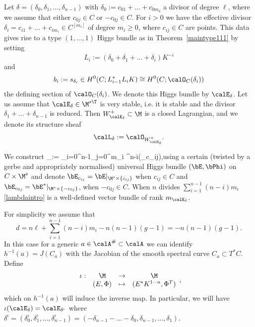 Let $\delta=(\delta_0,\delta_1,\dots,\delta_{n-1})$ with $\delta_0:=c_{01}+\dots+c_{0m_0}$ a divisor of degree $\ell$, where we assume that either $c_{0j}\in C$ or $-c_{0j}\in C$.  For $i>0$ we have the effective divisor $\delta_i={c_{i1}+\dots+c_{im_{i}}}\in C^{[m_i]}$  of degree $m_i\geq 0$, where $c_{ij}\in C$ are points. This data gives rise to a type $(1,\dots,1)$ Higgs bundle  as in Theorem~\ref{maintype111} by setting $$L_i:=(\delta_0+\delta_1+\dots + \delta_{i})K^{-i}$$ and $$b_i:=s_{\delta_i}\in H^0(C;L_{i-1}^*L_{i}K)\cong H^0(C;\calO_C(\delta_i))$$ the defining section of $\calO_C(\delta_i)$. We  denote this Higgs bundle by  $\calE_\delta$. Let us assume that  $\calE_\delta\in \M^{s\T}$ is very stable, i.e. it is stable and the divisor $\delta_1+\dots + \delta_{n-1}$ is reduced. Then $W^+_{\calE_\delta}\subset \M$ is a closed Lagrangian, and we denote its structure sheaf $$\calL_\delta:=\calO_{W^+_{\calE_\delta}}.$$

We construct  \beq\label{lambdaintro}\Lambda_\delta:= \bigotimes_{i=0}^{n-1}\bigotimes_{j=0}^{m_i} \Lambda^{n-i}(\bE_{c_{ij}}),\eeq  using a certain (twisted by a gerbe and appropriately normalised) universal Higgs bundle $(\bE,\bPhi)$ on $C\times \M^s$ and denote $\bE_{c_{ij}}=\bE|_{\M^s\times{\{c_{ij}\}}}$ when $c_{ij}\in C$ and $\bE_{c_{0j}}=\bE^*|_{\M^s\times{\{-c_{0j}\}}}$, when $-c_{0j}\in C$. When $n$ divides $\sum_{i=1}^{n-1} (n-i)m_i$ \eqref{lambdaintro} is a well-defined vector bundle of rank $m_{\calE_\delta}$.

For simplicity we assume that $$d=n\ell+\sum_{i=1}^{n-1}(n-i)m_i-n(n-1)(g-1)=-n(n-1)(g-1).$$ In this case for a generic $a\in \calA^\#\subset \calA$  we can identify $h^{-1}(a)=J(C_a)$ with the Jacobian of the smooth spectral curve $C_a\subset T^*C$. Define $$\begin{array}{cccc}\iota:&\M&\to& \M \\ &(E,\Phi)&\mapsto& (E^*K^{1-n},\Phi^T)\end{array},$$ which on $h^{-1}(a)$ will induce the inverse map. In particular, we will have $\iota(\calE_\delta)=\calE_{\delta^\iota}$ where $\delta^\iota=(\delta^\iota_0,\delta^\iota_1,\dots,\delta^\iota_{n-1})=(-\delta_{n-1}-\dots-\delta_0, \delta_{n-1},\dots,\delta_1).$

